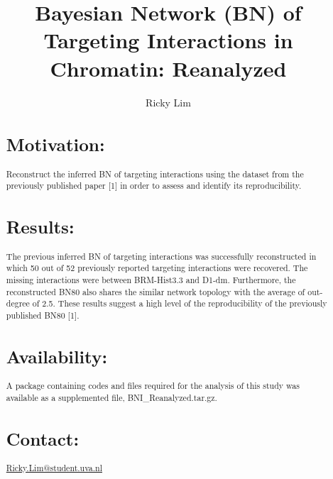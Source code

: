 \documentclass{bioinfo}
\begin{document}

\title[Bayesian Network (BN) of Targeting Interactions in Chromatin: Reanalyzed]{Bayesian Network (BN) of Targeting Interactions in Chromatin: Reanalyzed}
\author[Ricky Lim]{Ricky Lim}
\address{FNWI, Address Science Park 904,1098 XH Amsterdam\\
}



\history{}
\editor{}
\maketitle

\begin{abstract}

\section{Motivation:}
Reconstruct the inferred BN of targeting interactions using the dataset from the previously published paper [1] in order to assess and identify its reproducibility. 

\section{Results:}
The previous inferred BN of targeting interactions was successfully reconstructed in which 50 out of 52 previously reported targeting interactions were recovered. The missing interactions were between BRM-Hist3.3 and D1-dm. 
Furthermore, the reconstructed BN80 also shares the similar network topology with the average of out-degree of 2.5. These results suggest a high level of the reproducibility of the previously published BN80 [1].

\section{Availability:}
A package containing codes and files required for the analysis of this study was available as a supplemented file, BNI\_Reanalyzed.tar.gz.


\section{Contact:} \href{name@bio.com}{Ricky.Lim@student.uva.nl}
\end{abstract}
\end{document}
